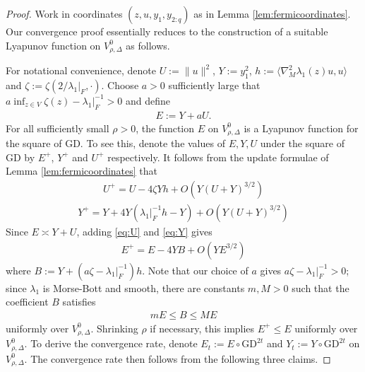 \documentclass{article}
\newcommand{\GD}{\mathrm{GD}}
\theoremstyle{plain}
\theoremstyle{definition}
\theoremstyle{remark}
\begin{document}
\begin{proof}
Work in coordinates $(z,u,y_1,y_{2:q})$ as in Lemma \ref{lem:fermicoordinates}. Our convergence proof essentially reduces to the construction of a suitable Lyapunov function on $V^0_{\rho,\Delta}$ as follows.

For notational convenience, denote $U:=\|u\|^2$, $Y:=y_1^2$, $h:=\langle \nabla_M^2\lambda_1(z)u,u\rangle$ and $\zeta:=\zeta({2/\lambda_1|_F},\cdot)$. Choose $a>0$ sufficiently large that $a\inf_{z\in V}\zeta(z)-\lambda_1|_F^{-1}>0$ and define
\begin{align}
E:=Y+aU.
\end{align}
For all sufficiently small $\rho>0$, the function $E$ on $V^0_{\rho,\Delta}$ is a Lyapunov function for the square of $\GD$. To see this, denote the values of $E,Y,U$ under the square of $\GD$ by $E^+$, $Y^+$ and $U^+$ respectively. It follows from the update formulae of Lemma \ref{lem:fermicoordinates} that
\begin{align}\label{eq:U}
U^+=U-4\zeta Yh+O(Y(U+Y)^{3/2})
\end{align}
\begin{align}\label{eq:Y}
Y^+=Y+4Y(\lambda_1|_F^{-1} h-Y)+O(Y(U+Y)^{3/2})
\end{align}
Since $E\asymp Y+U$, adding \eqref{eq:U} and \eqref{eq:Y} gives
\begin{align}\label{eq:E}
E^+ = E -4YB
+O(YE^{3/2})
\end{align}
where $B:=Y+(a\zeta-\lambda_1|_F^{-1})h$. Note that our choice of $a$ gives $a\zeta-\lambda_1|_F^{-1}>0$; since $\lambda_1$ is Morse-Bott and smooth, there are constants $m,M>0$ such that the coefficient $B$ satisfies
\begin{align}\label{eq:B}
mE\le B\le ME
\end{align}
uniformly over $V^0_{\rho,\Delta}$. Shrinking $\rho$ if necessary, this implies $E^+\leq E$ uniformly over $V^0_{\rho,\Delta}$. To derive the convergence rate, denote $E_t:=E\circ \GD^{2t}$ and $Y_t:=Y\circ\GD^{2t}$ on $V^0_{\rho,\Delta}$. The convergence rate then follows from the following three claims.


\end{proof}
\end{document}
